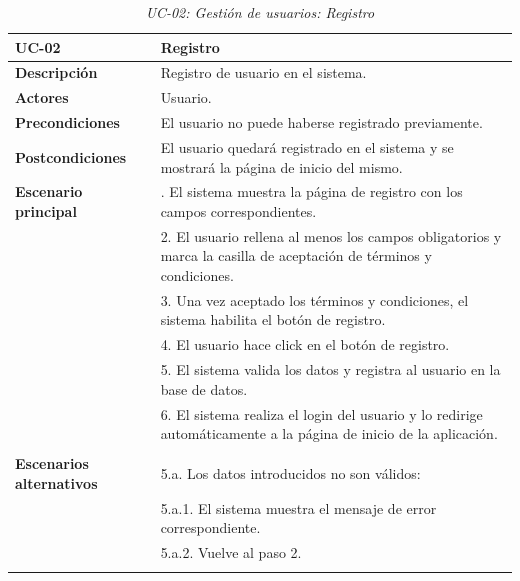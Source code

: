 \begin{table}[H]
  \begin{center}
    \begin{tabularx}{16.4cm}{|l|X|}
      \hline
      \textbf{UC-02} & \textbf{Registro}\\
      \hline
      \textbf{Descripción} & Registro de usuario en el sistema.\\
      \hline
      \textbf{Actores} & Usuario.\\
      \hline
      \textbf{Precondiciones} & El usuario no puede haberse registrado previamente.\\
      \hline
      \textbf{Postcondiciones} & El usuario quedará registrado en el sistema y se mostrará la página de inicio del mismo.\\
      \hline
      \textbf{Escenario principal} & \smallskip 1. El sistema muestra la página de registro con los campos correspondientes.\\
      & 2. El usuario rellena al menos los campos obligatorios y marca la casilla de aceptación de términos y condiciones. \\
      & 3. Una vez aceptado los términos y condiciones, el sistema habilita el botón de registro. \\ 
      & 4. El usuario hace click en el botón de registro.\\
      & 5. El sistema valida los datos y registra al usuario en la base de datos.\\
      & 6. El sistema realiza el login del usuario y lo redirige automáticamente a la página de inicio de la aplicación.\\
      & \\
      \hline
      \textbf{Escenarios alternativos} & \smallskip 5.a. Los datos introducidos no son válidos:\\
      & \hspace{0.3cm} 5.a.1. El sistema muestra el mensaje de error correspondiente.\\
      & \hspace{0.3cm} 5.a.2. Vuelve al paso 2.\\
      & \\
      \hline
    \end{tabularx}
    \caption{\textit{UC-02: Gestión de usuarios: Registro}}
    \label{tab:CU-registro}
  \end{center}
\end{table}


